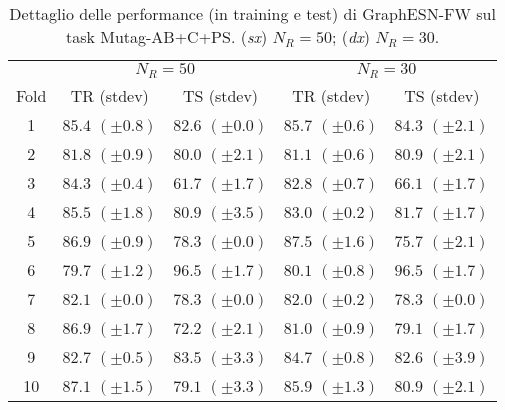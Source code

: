 \begin{table}[tbph]
\footnotesize
\caption[Dettaglio performance: GraphESN-FW su Mutag-AB+C+PS]{Dettaglio delle performance (in training e test) di GraphESN-FW sul task Mutag-AB+C+PS. (\emph{sx}) $N_R=50$; (\emph{dx}) $N_R=30$.}
\label{app:esp:Mutag-ABCPC-FW}
\centering
\begin{tabular}{c*{4}{c}}
\toprule
& \multicolumn{2}{c}{$N_R=50$} & \multicolumn{2}{c}{$N_R=30$}\\
Fold & TR (stdev) & TS (stdev) & TR (stdev) & TS (stdev)\\
\midrule
1 & $85.4$ $(\pm 0.8)$ & $82.6$ $(\pm 0.0)$ & $85.7$ $(\pm 0.6)$ & $84.3$ $(\pm 2.1)$\\
2 & $81.8$ $(\pm 0.9)$ & $80.0$ $(\pm 2.1)$ & $81.1$ $(\pm 0.6)$ & $80.9$ $(\pm 2.1)$\\
3 & $84.3$ $(\pm 0.4)$ & $61.7$ $(\pm 1.7)$ & $82.8$ $(\pm 0.7)$ & $66.1$ $(\pm 1.7)$\\
4 & $85.5$ $(\pm 1.8)$ & $80.9$ $(\pm 3.5)$ & $83.0$ $(\pm 0.2)$ & $81.7$ $(\pm 1.7)$\\
5 & $86.9$ $(\pm 0.9)$ & $78.3$ $(\pm 0.0)$ & $87.5$ $(\pm 1.6)$ & $75.7$ $(\pm 2.1)$\\
6 & $79.7$ $(\pm 1.2)$ & $96.5$ $(\pm 1.7)$ & $80.1$ $(\pm 0.8)$ & $96.5$ $(\pm 1.7)$\\
7 & $82.1$ $(\pm 0.0)$ & $78.3$ $(\pm 0.0)$ & $82.0$ $(\pm 0.2)$ & $78.3$ $(\pm 0.0)$\\
8 & $86.9$ $(\pm 1.7)$ & $72.2$ $(\pm 2.1)$ & $81.0$ $(\pm 0.9)$ & $79.1$ $(\pm 1.7)$\\
9 & $82.7$ $(\pm 0.5)$ & $83.5$ $(\pm 3.3)$ & $84.7$ $(\pm 0.8)$ & $82.6$ $(\pm 3.9)$\\
10 & $87.1$ $(\pm 1.5)$ & $79.1$ $(\pm 3.3)$ & $85.9$ $(\pm 1.3)$ & $80.9$ $(\pm 2.1)$\\
\bottomrule
\end{tabular}
\end{table}



